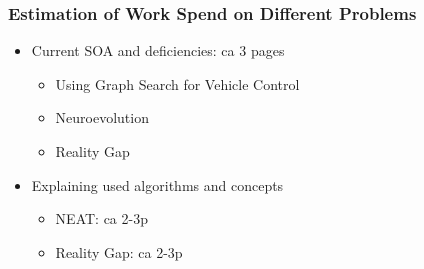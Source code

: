 \documentclass[8pt]{beamer}
\begin{document}
\begin{frame}
	\frametitle{Estimation of Work Spend on Different Problems}
	\begin{itemize}
		\item Current SOA and deficiencies: ca 3 pages
		\begin{itemize}
			\item Using Graph Search for Vehicle Control
			\item Neuroevolution
			\item Reality Gap
		\end{itemize}
		\item Explaining used algorithms and concepts
		\begin{itemize}
			\item NEAT: ca 2-3p
			\item Reality Gap: ca 2-3p
		\end{itemize}				 
	\end{itemize}
\end{frame}
\end{document}
